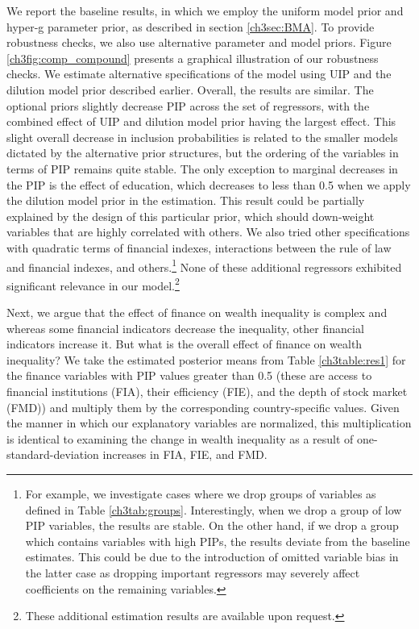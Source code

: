 \begin{refsection}
We report the baseline results, in which we employ the uniform model prior and hyper-g parameter prior, as described in section \ref{ch3sec:BMA}. To provide robustness checks, we also use alternative parameter and model priors. Figure \ref{ch3fig:comp_compound} presents a graphical illustration of our robustness checks. We estimate alternative specifications of the model using \ac{UIP} and the dilution model prior described earlier. Overall, the results are similar. The optional priors slightly decrease \ac{PIP} across the set of regressors, with the combined effect of \ac{UIP} and dilution model prior having the largest effect. This slight overall decrease in inclusion probabilities is related to the smaller models dictated by the alternative prior structures, but the ordering of the variables in terms of \ac{PIP} remains quite stable. The only exception to marginal decreases in the \ac{PIP} is the effect of education, which decreases to less than 0.5 when we apply the dilution model prior in the estimation. This result could be partially explained by the design of this particular prior, which should down-weight variables that are highly correlated with others. We also tried other specifications with quadratic terms of financial indexes, interactions between the rule of law and financial indexes, and others.\footnote{For example, we investigate cases where we drop groups of variables as defined in Table \ref{ch3tab:groups}. Interestingly, when we drop a group of low \ac{PIP} variables, the results are stable. On the other hand, if we drop a group which contains variables with high \acp{PIP}, the results deviate from the baseline estimates. This could be due to the introduction of omitted variable bias in the latter case as dropping important regressors may severely affect coefficients on the remaining variables.} None of these additional regressors exhibited significant relevance in our model.\footnote{These additional estimation results are available upon request.}

Next, we argue that the effect of finance on wealth inequality is complex and whereas some financial indicators decrease the inequality, other financial indicators increase it. But what is the overall effect of finance on wealth inequality? We take the estimated posterior means from Table \ref{ch3table:res1} for the finance variables with \ac{PIP} values greater than 0.5 (these are access to financial institutions (FIA), their efficiency (FIE), and the depth of stock market (FMD)) and multiply them by the corresponding country-specific values. Given the manner in which our explanatory variables are normalized, this multiplication is identical to examining the change in wealth inequality as a result of one-standard-deviation increases in FIA, FIE, and FMD. 


\end{refsection}
